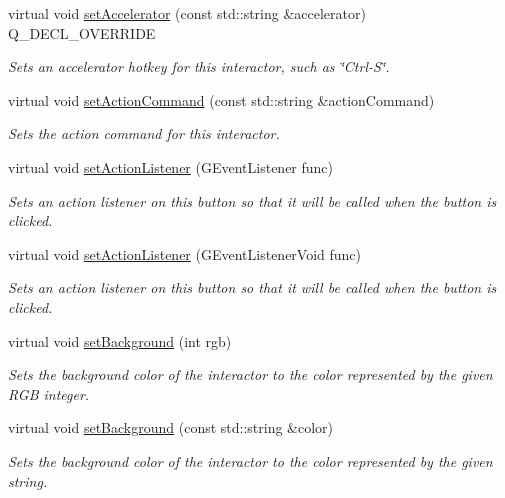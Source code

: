 \begin{DoxyCompactItemize}
virtual void \mbox{\hyperlink{classGButton_a5f78fc506a33b57dced42a419be34446}{set\+Accelerator}} (const std\+::string \&accelerator) Q\+\_\+\+D\+E\+C\+L\+\_\+\+O\+V\+E\+R\+R\+I\+DE
\begin{DoxyCompactList}\small\item\em Sets an accelerator hotkey for this interactor, such as \char`\"{}\+Ctrl-\/\+S\char`\"{}. \end{DoxyCompactList}\item 
virtual void \mbox{\hyperlink{classGInteractor_a4b5843fe3030e038a1ba54cc03389bcf}{set\+Action\+Command}} (const std\+::string \&action\+Command)
\begin{DoxyCompactList}\small\item\em Sets the action command for this interactor. \end{DoxyCompactList}\item 
virtual void \mbox{\hyperlink{classGButton_adcfb4742430c88714fcf57e57ab8ea9c}{set\+Action\+Listener}} (G\+Event\+Listener func)
\begin{DoxyCompactList}\small\item\em Sets an action listener on this button so that it will be called when the button is clicked. \end{DoxyCompactList}\item 
virtual void \mbox{\hyperlink{classGButton_aebd20a89c7a8a43a6fce999cf4f9fcf2}{set\+Action\+Listener}} (G\+Event\+Listener\+Void func)
\begin{DoxyCompactList}\small\item\em Sets an action listener on this button so that it will be called when the button is clicked. \end{DoxyCompactList}\item 
virtual void \mbox{\hyperlink{classGInteractor_acba7e546c2025c0a15ca4b4cc92043db}{set\+Background}} (int rgb)
\begin{DoxyCompactList}\small\item\em Sets the background color of the interactor to the color represented by the given R\+GB integer. \end{DoxyCompactList}\item 
virtual void \mbox{\hyperlink{classGInteractor_ab4677ab2474e68b07aa56605af92a84a}{set\+Background}} (const std\+::string \&color)
\begin{DoxyCompactList}\small\item\em Sets the background color of the interactor to the color represented by the given string. \end{DoxyCompactList}\item 

\end{DoxyCompactItemize}
